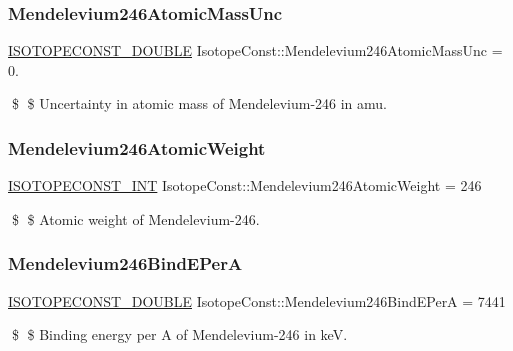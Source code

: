 \subsubsection{\texorpdfstring{Mendelevium246\+Atomic\+Mass\+Unc}{Mendelevium246AtomicMassUnc}}
{\footnotesize\ttfamily \mbox{\hyperlink{group___isotope_const-_macros_ga8f45a7272ce02c0b4c65c44636ed719a}{I\+S\+O\+T\+O\+P\+E\+C\+O\+N\+S\+T\+\_\+\+D\+O\+U\+B\+LE}} Isotope\+Const\+::\+Mendelevium246\+Atomic\+Mass\+Unc = 0.}

\$ \$ Uncertainty in atomic mass of Mendelevium-\/246 in amu. \mbox{\label{group___isotope_const-_mendelevium-_md246_ga3e63c9fe753b3cd0ed55de686f5f3e4d}} 
\subsubsection{\texorpdfstring{Mendelevium246\+Atomic\+Weight}{Mendelevium246AtomicWeight}}
{\footnotesize\ttfamily \mbox{\hyperlink{group___isotope_const-_macros_ga5f18360b3e99483a35c32d789e62621c}{I\+S\+O\+T\+O\+P\+E\+C\+O\+N\+S\+T\+\_\+\+I\+NT}} Isotope\+Const\+::\+Mendelevium246\+Atomic\+Weight = 246}

\$ \$ Atomic weight of Mendelevium-\/246. \mbox{\label{group___isotope_const-_mendelevium-_md246_ga8f39c73b89c87977a2e6c4bfcd1f0bfa}} 
\subsubsection{\texorpdfstring{Mendelevium246\+Bind\+E\+PerA}{Mendelevium246BindEPerA}}
{\footnotesize\ttfamily \mbox{\hyperlink{group___isotope_const-_macros_ga8f45a7272ce02c0b4c65c44636ed719a}{I\+S\+O\+T\+O\+P\+E\+C\+O\+N\+S\+T\+\_\+\+D\+O\+U\+B\+LE}} Isotope\+Const\+::\+Mendelevium246\+Bind\+E\+PerA = 7441}

\$ \$ Binding energy per A of Mendelevium-\/246 in keV. \mbox{\label{group___isotope_const-_mendelevium-_md246_gad0cd5bd439849235094fecfabeed0aec}} 
